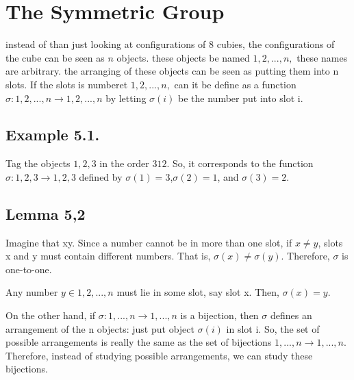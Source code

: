 \section{The Symmetric Group}

instead of than just looking at configurations of 8 cubies, the configurations of the cube can be seen as $n$ objects. 
these objects be named $1, 2, . . . , n,$ these names are arbitrary. the arranging of these objects can be seen as
putting them into n slots. If the slots is numberet $1, 2, . . . , n,$ can it be define as a function $\sigma : {1, 2, . . . , n} \rightarrow
{1, 2, . . . , n}$ by letting $\sigma(i)$ be the number put into slot i.

\subsection{Example 5.1.} 
Tag the objects $1, 2, 3$ in the order $3 1 2$. So, it corresponds to the function $\sigma: {1, 2, 3} \rightarrow {1, 2, 3}$
defined by $\sigma(1) = 3$,$\sigma(2) = 1$, and $\sigma(3) = 2$.

\subsection{Lemma 5,2}
Imagine that x\neq y. Since a number cannot be in more than one slot, if $x \neq y$, slots x and y must contain
different numbers. That is, $\sigma(x) \neq \sigma(y)$. Therefore, $\sigma$ is one-to-one.

Any number $y \in {1, 2, . . . , n}$ must lie in some slot, say slot x. Then, $\sigma(x) = y$.

On the other hand, if $\sigma: {1, . . . , n} \rightarrow {1, . . . , n}$ is a bijection, then $\sigma$ defines an arrangement of the n
objects: just put object $\sigma(i)$ in slot i. So, the set of possible arrangements is really the same as the set of
bijections ${1, . . . , n} \rightarrow {1, . . . , n}$. Therefore, instead of studying possible arrangements, we can study these
bijections.


\myTail{
}
%